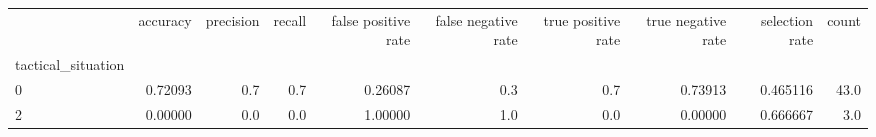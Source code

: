 \begin{tabular}{lrrrrrrrrr}
\toprule
{} &  accuracy &  precision &  recall &  false positive rate &  false negative rate &  true positive rate &  true negative rate &  selection rate &  count \\
tactical\_situation &           &            &         &                      &                      &                     &                     &                 &        \\
\midrule
0                  &   0.72093 &        0.7 &     0.7 &              0.26087 &                  0.3 &                 0.7 &             0.73913 &        0.465116 &   43.0 \\
2                  &   0.00000 &        0.0 &     0.0 &              1.00000 &                  1.0 &                 0.0 &             0.00000 &        0.666667 &    3.0 \\
\bottomrule
\end{tabular}
